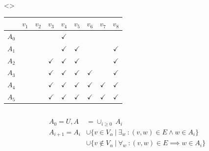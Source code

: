 \documentclass[aspectratio=169]{beamer}
\newcounter{picite}
\begin{document}
\begin{frame}[t]
\begin{columns}[T]
\begin{column}{0.5\textwidth}
{\begin{tabular}{|c|c|c|c|c|c|c|c|c|}
	\end{tabular}}
	\pause{}\pause{}\pause{}\pause{}\pause{}\pause%
		\only<\thepicite>{%
	\begin{tabular}{|c|c|c|c|c|c|c|c|c|}
		\hline
		& $v_1$&$v_2$&$v_3$&$v_4$&$v_5$&$v_6$&$v_7$&$v_8$\\ \hline
		$A_0$ & & & & $\checkmark$ & & & &\\ \hline
		$A_1$ & & & & $\checkmark$ & $\checkmark$& & &$\checkmark$\\ \hline
		$A_2$ & & & $\checkmark$& $\checkmark$ & $\checkmark$& & &$\checkmark$\\ \hline
		$A_3$ & & & $\checkmark$& $\checkmark$ & $\checkmark$& $\checkmark$& &$\checkmark$\\ \hline
		$A_4$ & & & $\checkmark$& $\checkmark$ & $\checkmark$& $\checkmark$&$\checkmark$ &$\checkmark$\\ \hline
		$A_5$ & & & $\checkmark$& $\checkmark$ & $\checkmark$& $\checkmark$& $\checkmark$&$\checkmark$\\ \hline
	\end{tabular}	
}
	\end{column}
\end{columns}
	\begin{align*}
	A_0 = U,A& = \cup_{i\geq 0}\ A_i\\
	A_{i+1} = A_i &\cup \{v \in V_\alpha\ |\ \exists_w\ : (v,w) \in E \wedge w \in A_i \} \\
	 &\cup \{v \notin V_\alpha\ |\ \forall_w\ : (v,w) \in E \implies w \in A_i \}\\
	\end{align*}
\end{frame}

\end{document}
